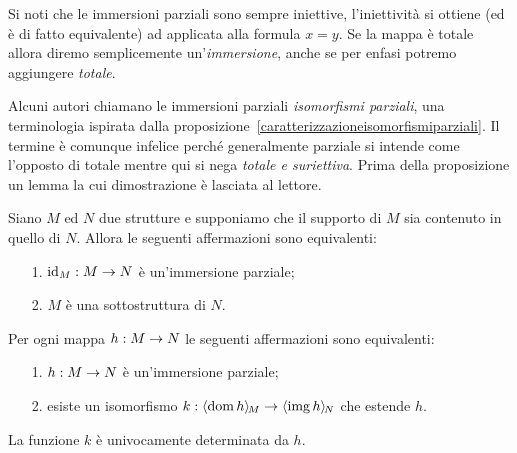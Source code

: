 Si noti che le immersioni parziali sono sempre iniettive, l'iniettivit\`a si ottiene (ed \`e di fatto equivalente) ad  applicata alla formula $x=y$. Se la mappa \`e totale allora diremo semplicemente un'\emph{immersione}, anche se per enfasi potremo aggiungere \emph{totale}.

Alcuni autori chiamano le immersioni parziali \emph{isomorfismi parziali}, una terminologia ispirata dalla proposizione~\ref{caratterizzazioneisomorfismiparziali}. Il termine \`e comunque infelice perch\'e generalmente parziale si intende come l'opposto di totale mentre qui si nega  \textit{totale e suriettiva}. Prima della proposizione un lemma la cui dimostrazione \`e lasciata al lettore.

\begin{lemma}\label{ovvio}
Siano $M$ ed $N$ due strutture e supponiamo che il supporto di $M$ sia contenuto in quello di $N$. Allora le seguenti affermazioni sono equivalenti:
\begin{itemize}
\item[1.] $\textrm{id}_M:M\rightarrow N$ \`e un'immersione parziale;
\item[2.] $M$ \`e una sottostruttura di $N$.
\end{itemize}
\end{lemma}

\begin{proposition}
\label{caratterizzazioneisomorfismiparziali}
Per ogni mappa $h:M\rightarrow N$ le seguenti affermazioni sono equivalenti:
\begin{itemize}
\item[1.] $h:M\rightarrow N$ \`e un'immersione parziale;
\item[2.] esiste un isomorfismo $k:\langle\mathop{\rm dom} h\rangle_{\!M}\rightarrow \langle\mathop{\rm img} h\rangle_{\!N}$ che estende $h$.
\end{itemize}
La funzione $k$ \`e univocamente determinata da $h$.
\end{proposition}

